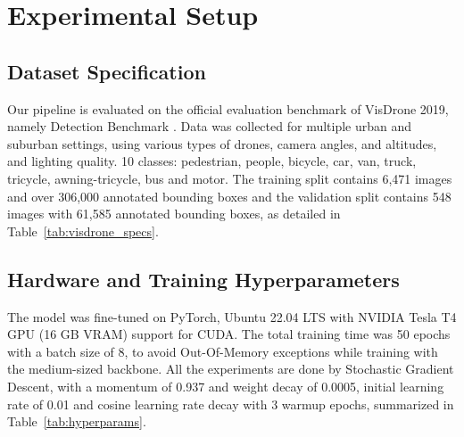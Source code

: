 \documentclass[conference]{IEEEtran}
\begin{document}
\begin{table}[!t]
\caption{VisDrone 2019 Dataset Characteristics and Class Mapping}
\label{tab:visdrone_specs}
\centering
{}
\end{table}

\section{Experimental Setup}

\subsection{Dataset Specification}
Our pipeline is evaluated on the official evaluation benchmark of VisDrone 2019, namely Detection Benchmark \cite{zhu2021detection}. Data was collected for multiple urban and suburban settings, using various types of drones, camera angles, and altitudes, and lighting quality. 10 classes: pedestrian, people, bicycle, car, van, truck, tricycle, awning-tricycle, bus and motor. The training split contains 6,471 images and over 306,000 annotated bounding boxes and the validation split contains 548 images with 61,585 annotated bounding boxes, as detailed in Table~\ref{tab:visdrone_specs}.

\subsection{Hardware and Training Hyperparameters}
The model was fine-tuned on PyTorch, Ubuntu 22.04 LTS with NVIDIA Tesla T4 GPU (16 GB VRAM) support for CUDA. The total training time was 50 epochs with a batch size of 8, to avoid Out-Of-Memory exceptions while training with the medium-sized backbone. All the experiments are done by Stochastic Gradient Descent, with a momentum of 0.937 and weight decay of 0.0005, initial learning rate of 0.01 and cosine learning rate decay with 3 warmup epochs, summarized in Table~\ref{tab:hyperparams}.
\end{document}
